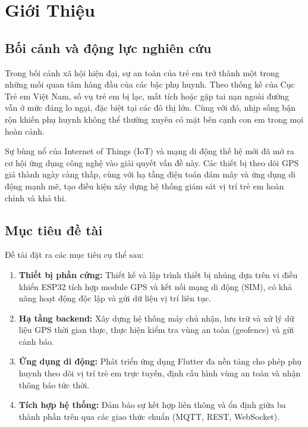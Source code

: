 \chapter{Giới Thiệu}

\section{Bối cảnh và động lực nghiên cứu}

Trong bối cảnh xã hội hiện đại, sự an toàn của trẻ em trở thành một trong những mối quan tâm hàng đầu của các bậc phụ huynh. Theo thống kê của Cục Trẻ em Việt Nam, số vụ trẻ em bị lạc, mất tích hoặc gặp tai nạn ngoài đường vẫn ở mức đáng lo ngại, đặc biệt tại các đô thị lớn. Cùng với đó, nhịp sống bận rộn khiến phụ huynh không thể thường xuyên có mặt bên cạnh con em trong mọi hoàn cảnh.

Sự bùng nổ của Internet of Things (IoT) và mạng di động thế hệ mới đã mở ra cơ hội ứng dụng công nghệ vào giải quyết vấn đề này. Các thiết bị theo dõi GPS giá thành ngày càng thấp, cùng với hạ tầng điện toán đám mây và ứng dụng di động mạnh mẽ, tạo điều kiện xây dựng hệ thống giám sát vị trí trẻ em hoàn chỉnh và khả thi.

\section{Mục tiêu đề tài}

Đề tài đặt ra các mục tiêu cụ thể sau:

\begin{enumerate}
  \item \textbf{Thiết bị phần cứng:} Thiết kế và lập trình thiết bị nhúng dựa trên vi điều khiển ESP32 tích hợp module GPS và kết nối mạng di động (SIM), có khả năng hoạt động độc lập và gửi dữ liệu vị trí liên tục.

  \item \textbf{Hạ tầng backend:} Xây dựng hệ thống máy chủ nhận, lưu trữ và xử lý dữ liệu GPS thời gian thực, thực hiện kiểm tra vùng an toàn (geofence) và gửi cảnh báo.

  \item \textbf{Ứng dụng di động:} Phát triển ứng dụng Flutter đa nền tảng cho phép phụ huynh theo dõi vị trí trẻ em trực tuyến, định cấu hình vùng an toàn và nhận thông báo tức thời.

  \item \textbf{Tích hợp hệ thống:} Đảm bảo sự kết hợp liên thông và ổn định giữa ba thành phần trên qua các giao thức chuẩn (MQTT, REST, WebSocket).
\end{enumerate}

